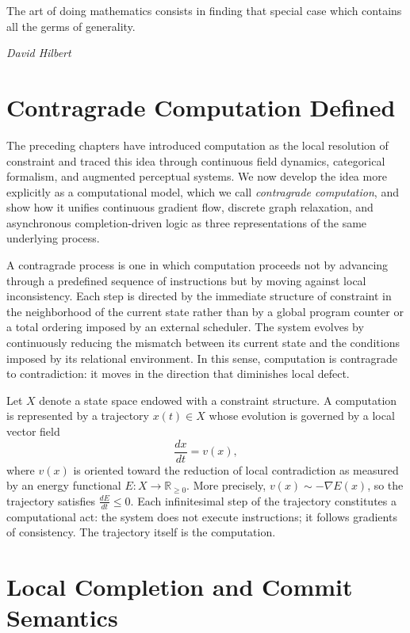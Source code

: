 \documentclass[12pt,a4paper,openany]{book}
\theoremstyle{plain}
\theoremstyle{definition}
\theoremstyle{remark}
\begin{document}
\epigraph{%
  The art of doing mathematics consists in finding that special case
  which contains all the germs of generality.
}{%
  \textit{David Hilbert}}

\section{Contragrade Computation Defined}

The preceding chapters have introduced computation as the local resolution of constraint and traced this idea through continuous field dynamics, categorical formalism, and augmented perceptual systems. We now develop the idea more explicitly as a computational model, which we call \emph{contragrade computation}, and show how it unifies continuous gradient flow, discrete graph relaxation, and asynchronous completion-driven logic as three representations of the same underlying process.

A contragrade process is one in which computation proceeds not by advancing through a predefined sequence of instructions but by moving against local inconsistency. Each step is directed by the immediate structure of constraint in the neighborhood of the current state rather than by a global program counter or a total ordering imposed by an external scheduler. The system evolves by continuously reducing the mismatch between its current state and the conditions imposed by its relational environment. In this sense, computation is contragrade to contradiction: it moves in the direction that diminishes local defect.

Let $X$ denote a state space endowed with a constraint structure. A computation is represented by a trajectory $x(t) \in X$ whose evolution is governed by a local vector field
\[
\frac{dx}{dt} = v(x),
\]
where $v(x)$ is oriented toward the reduction of local contradiction as measured by an energy functional $E : X \to \mathbb{R}_{\geq 0}$. More precisely, $v(x) \sim -\nabla E(x)$, so the trajectory satisfies $\frac{dE}{dt} \leq 0$. Each infinitesimal step of the trajectory constitutes a computational act: the system does not execute instructions; it follows gradients of consistency. The trajectory itself is the computation.

\section{Local Completion and Commit Semantics}
\end{document}
